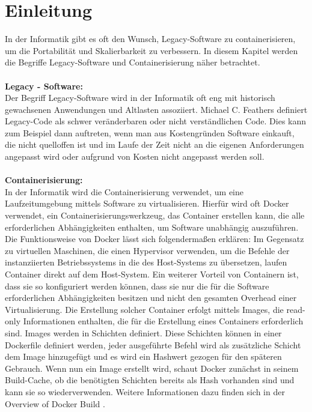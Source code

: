 

\section{Einleitung}

In der Informatik gibt es oft den Wunsch, Legacy-Software zu containerisieren, um die Portabilität und Skalierbarkeit zu verbessern. In diesem Kapitel werden die Begriffe Legacy-Software und Containerisierung näher betrachtet. \\ \\
\textbf{Legacy - Software:} \\
Der Begriff Legacy-Software wird in der Informatik oft eng mit historisch gewachsenen Anwendungen und Altlasten assoziiert. Michael C. Feathers definiert Legacy-Code als schwer veränderbaren oder nicht verständlichen Code. Dies kann zum Beispiel dann auftreten, wenn man aus Kostengründen Software einkauft, die nicht quelloffen ist und im Laufe der Zeit nicht an die eigenen Anforderungen angepasst wird oder aufgrund von Kosten nicht angepasst werden soll. \\ \\
\textbf{Containerisierung:} \\
In der Informatik wird die Containerisierung verwendet, um eine Laufzeitumgebung mittels Software zu virtualisieren. Hierfür wird oft Docker verwendet, ein Containerisierungswerkzeug, das Container erstellen kann, die alle erforderlichen Abhängigkeiten enthalten, um Software unabhängig auszuführen. Die Funktionsweise von Docker lässt sich folgendermaßen erklären: Im Gegensatz zu virtuellen Maschinen, die einen Hypervisor verwenden, um die Befehle der instanziierten Betriebssystems in die des Host-Systems zu übersetzen, laufen Container direkt auf dem Host-System. Ein weiterer Vorteil von Containern ist, dass sie so konfiguriert werden können, dass sie nur die für die Software erforderlichen Abhängigkeiten besitzen und nicht den gesamten Overhead einer Virtualisierung. Die Erstellung solcher Container erfolgt mittels Images, die read-only Informationen enthalten, die für die Erstellung eines Containers erforderlich sind. Images werden in Schichten definiert. Diese Schichten können in einer Dockerfile definiert werden, jeder ausgeführte Befehl wird als zusätzliche Schicht dem Image hinzugefügt und es wird ein Hashwert gezogen für den späteren Gebrauch. Wenn nun ein Image erstellt wird, schaut Docker zunächst in seinem Build-Cache, ob die benötigten Schichten bereits als Hash vorhanden sind und kann sie so wiederverwenden. Weitere Informationen dazu finden sich in der Overview of Docker Build \cite{dockerbuild}. \\ \\

